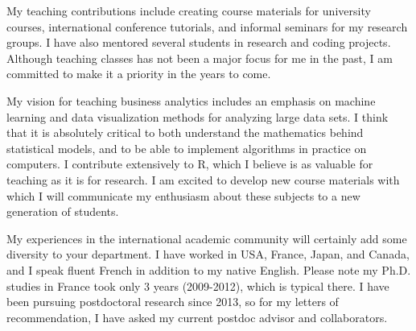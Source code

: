 \documentclass{article}
\begin{document}


My teaching contributions include creating course materials for
university courses, international conference tutorials, and informal
seminars for my research groups. I have also mentored several students
in research and coding projects. 
Although teaching classes has not been a
major focus for me in the past, I am committed to make it a
priority in the years to come.

My vision for teaching 
business analytics
includes an emphasis on machine
learning and data visualization methods for analyzing large data
sets. I think that it is absolutely critical to both understand the
mathematics behind statistical models, and to be able to implement
algorithms in practice on computers. I contribute extensively to R,
which I believe is as valuable for teaching as it is for research. I
am excited to develop new course materials with which I will
communicate my enthusiasm about these subjects to a new generation of
students.

My experiences in the international academic community will certainly
add some diversity to your department. I have worked in USA, France,
Japan, and Canada, and I speak fluent French in addition to my
native English. Please note my Ph.D. studies in France took only 3
years (2009-2012), which is typical there.
I have been pursuing postdoctoral research since 2013, so
for my letters of recommendation, I have asked my current postdoc
advisor and collaborators.
\end{document}

